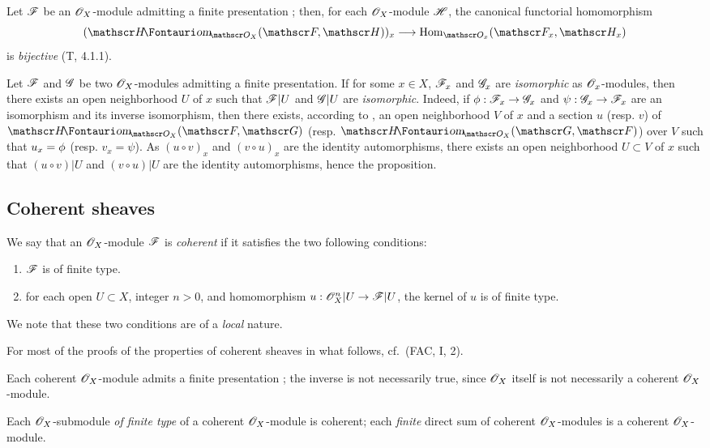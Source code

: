 \begin{env}[5.2.6]
\label{0.5.2.6}
Let $\mathscr{F}$ be an $\mathscr{O}_X$-module admitting a finite presentation ;
then, for each $\mathscr{O}_X$-module $\mathscr{H}$, the canonical functorial homomorphism
\[
  (\shHom_{\OO_X}(\sh{F},\sh{H}))_x\to\Hom_{\OO_x}(\sh{F}_x,\sh{H}_x)
\]
is \emph{bijective} (T, 4.1.1).
\end{env}

\begin{env}[5.2.7]
\label{0.5.2.7}
Let $\mathscr{F}$ and $\mathscr{G}$ be two $\mathscr{O}_X$-modules admitting a finite presentation.
If for some $x\in X$, $\mathscr{F}_x$ and $\mathscr{G}_x$ are \emph{isomorphic} as $\mathscr{O}_x$-modules, then there exists an open neighborhood $U$ of $x$ such that $\mathscr{F}|U$ and $\mathscr{G}|U$ are \emph{isomorphic}.
Indeed, if $\vphi:\sh{F}_x\to\sh{G}_x$ and $\psi:\sh{G}_x\to\sh{F}_x$ are an isomorphism and its inverse isomorphism, then there exists, according to , an open neighborhood $V$ of $x$ and a section $u$ (resp. $v$) of $\shHom_{\OO_X}(\sh{F},\sh{G})$ (resp. $\shHom_{\OO_X}(\sh{G},\sh{F})$) over $V$ such
that $u_x=\phi$ (resp. $v_x=\psi$).
As $(u\circ v)_x$ and $(v\circ u)_x$ are the identity automorphisms, there exists an open neighborhood $U\subset V$ of $x$ such that $(u\circ v)|U$ and $(v\circ u)|U$ are the identity automorphisms, hence the proposition.
\end{env}

\subsection{Coherent sheaves}
\label{subsection:coh-sheaves}

\begin{env}[5.3.1]
\label{0.5.3.1}
We say that an $\mathscr{O}_X$-module $\mathscr{F}$ is \emph{coherent} if it satisfies the two following conditions:
\begin{enumerate}[label=(\alph*)]
  \item $\mathscr{F}$ is of finite type.
  \item for each open $U\subset X$, integer $n>0$, and homomorphism $u:\OO_X^n|U\to\sh{F}|U$, the kernel of $u$ is of finite type.
\end{enumerate}
We note that these two conditions are of a \emph{local} nature.

For most of the proofs of the properties of coherent sheaves in what follows, cf.~(FAC, I, 2).
\end{env}

\begin{env}[5.3.2]
\label{0.5.3.2}
Each coherent $\mathscr{O}_X$-module admits a finite presentation ;
the inverse is not necessarily true, since $\mathscr{O}_X$ itself is not necessarily a coherent $\mathscr{O}_X$-module.

Each $\mathscr{O}_X$-submodule \emph{of finite type} of a coherent $\mathscr{O}_X$-module is coherent;
each \emph{finite} direct sum of coherent $\mathscr{O}_X$-modules is a coherent $\mathscr{O}_X$-module.
\end{env}

